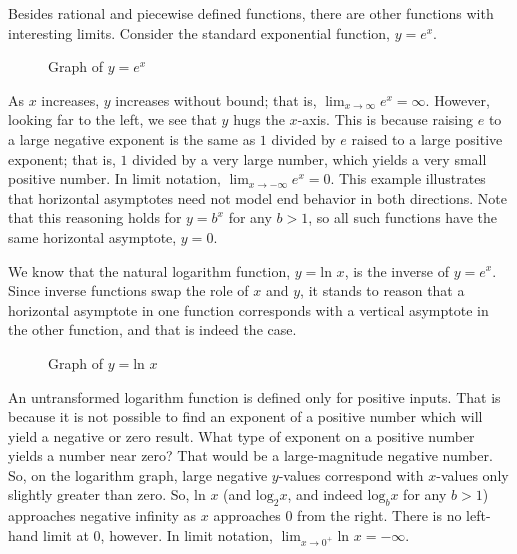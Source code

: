 Besides rational and piecewise defined functions, there are other functions with interesting limits. Consider the standard exponential function, $y = e^x$.

\begin{figure}[htbp]
  \centering
  \caption{Graph of \( y = e^x \)}
\end{figure}	

As $x$ increases, $y$ increases without bound; that is, $\lim_{x \rightarrow \infty} e^x = \infty$. However, looking far to the left, we see that $y$ hugs the $x$-axis. This is because raising $e$ to a large negative exponent is the same as $1$ divided by $e$ raised to a large positive exponent; that is, $1$ divided by a very large number, which yields a very small positive number. In limit notation, $\lim_{x \rightarrow -\infty} e^x = 0$. This example illustrates that horizontal asymptotes need not model end behavior in both directions. Note that this reasoning holds for $y = b^x$ for any $b > 1$, so all such functions have the same horizontal asymptote, $y = 0$.

We know that the natural logarithm function, $y = \text{ln } x$, is the inverse of $y = e^x$. Since inverse functions swap the role of $x$ and $y$, it stands to reason that a horizontal asymptote in one function corresponds with a vertical asymptote in the other function, and that is indeed the case.

\begin{figure}[htbp]
  \centering
  \caption{Graph of \( y = \text{ln } x \)}
\end{figure}	

An untransformed logarithm function is defined only for positive inputs. That is because it is not possible to find an exponent of a positive number which will yield a negative or zero result. What type of exponent on a positive number yields a number near zero? That would be a large-magnitude negative number. So, on the logarithm graph, large negative $y$-values correspond with $x$-values only slightly greater than zero. So, $\text{ln } x$ (and $\text{log}_2 x$, and indeed $\text{log}_b x$ for any $b > 1$) approaches negative infinity as $x$ approaches $0$ from the right. There is no left-hand limit at $0$, however. In limit notation, $\lim_{x \rightarrow 0^+} \text{ln } x = -\infty$.

